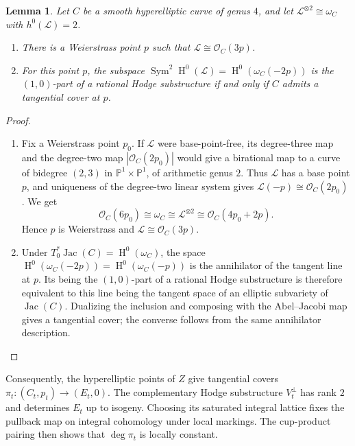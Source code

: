 \documentclass{amsart}
\newtheorem{lemma}{Lemma}[section]
\DeclareMathOperator{\Sym}{Sym}
\DeclareMathOperator{\Hnm}{H}
\DeclareMathOperator{\Jac}{Jac}
\begin{document}
\begin{lemma}\label{lem:hyperelliptic}
Let $C$ be a smooth hyperelliptic curve of genus $4$, and let
$\mathcal{L}^{\otimes 2}\cong\omega_C$ with $h^0(\mathcal{L})=2$.
\begin{enumerate}
\item There is a Weierstrass point $p$ such that $\mathcal{L}\cong\mathcal{O}_C(3p)$.
\item For this point $p$, the subspace
$\Sym^2\Hnm^0(\mathcal{L})=\Hnm^0\left(\omega_C(-2p)\right)$ is the $(1,0)$-part of a rational
Hodge substructure if and only if $C$ admits a tangential cover at $p$.
\end{enumerate}
\end{lemma}

\begin{proof}\
\begin{enumerate}
\item Fix a Weierstrass point $p_0$. If $\mathcal{L}$ were base-point-free, its
degree-three map and the degree-two map $|\mathcal{O}_C(2p_0)|$ would give
a birational map to a curve of bidegree $(2,3)$ in
$\mathbb{P}^1\times\mathbb{P}^1$, of arithmetic genus $2$. Thus
$\mathcal{L}$ has a base point $p$, and uniqueness of the degree-two
linear system gives $\mathcal{L}(-p)\cong\mathcal{O}_C(2p_0)$. We get
$$
\mathcal{O}_C(6p_0)\cong\omega_C \cong\mathcal{L}^{\otimes 2}\cong\mathcal{O}_C(4p_0+2p).
$$
Hence $p$ is Weierstrass and
$\mathcal{L}\cong\mathcal{O}_C(3p)$. 

\item Under $T_0^*\Jac(C)=\Hnm^0(\omega_C)$, the space
$\Hnm^0\left(\omega_C(-2p)\right)=\Hnm^0\left(\omega_C(-p)\right)$
is the annihilator of the tangent line at $p$. Its being the $(1,0)$-part
of a rational Hodge substructure is therefore equivalent to this line
being the tangent space of an elliptic subvariety of $\Jac(C)$.
Dualizing the inclusion and composing with the Abel--Jacobi map gives
a tangential cover; the converse follows from the same annihilator
description.
\end{enumerate}
\end{proof}

Consequently, the hyperelliptic points of $Z$ give tangential covers
$\pi_t:(C_t,p_t)\longrightarrow(E_t,0)$. The complementary Hodge
substructure $V_t^\perp$ has rank $2$ and determines $E_t$ up to isogeny.
Choosing its saturated integral lattice fixes the pullback map on
integral cohomology under local markings. The cup-product pairing then
shows that $\deg\pi_t$ is locally constant.
\end{document}
